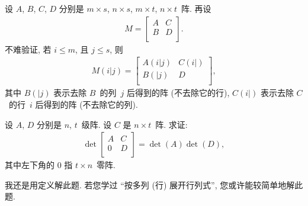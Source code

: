 设 \(A\), \(B\), \(C\), \(D\)
分别是 \(m \times s\), \(n \times s\),
\(m \times t\), \(n \times t\)~阵.
再设
\begin{align*}
    M = \begin{bmatrix}
            A & C \\
            B & D \\
        \end{bmatrix}.
\end{align*}
不难验证, 若 \(i \leq m\), 且 \(j \leq s\),
则
\begin{align*}
    M(i|j)
    =
    \begin{bmatrix}
        A(i|j) & C(i|) \\
        B(|j)  & D     \\
    \end{bmatrix},
\end{align*}
其中 \(B(|j)\) 表示去除 \(B\)~的列~\(j\) 后得到的阵
(不去除它的行),
\(C(i|)\) 表示去除 \(C\)~的行~\(i\) 后得到的阵
(不去除它的列).

\begin{example}
    设 \(A\), \(D\) 分别是 \(n\), \(t\)~级阵.
    设 \(C\) 是 \(n \times t\)~阵.
    求证:
    \begin{align*}
        \det {
            \begin{bmatrix}
                A & C \\
                0 & D \\
            \end{bmatrix}
        }
        = \det {(A)} \det {(D)},
    \end{align*}
    其中左下角的 \(0\) 指 \(t \times n\)~零阵.
\end{example}


我还是用定义解此题.
若您学过 ``按多列 (行) 展开行列式'',
您或许能较简单地解此题.

